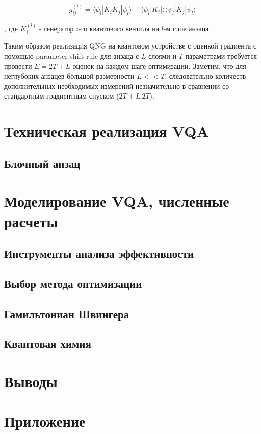 \documentclass[12pt]{extarticle}
\begin{document}
\begin{equation}
g_{ij}^{(l)} = \langle \psi_{l} | K_{i}K_{j} |\psi_{l}  \rangle - \langle \psi_{l} | K_{i} | \rangle  \langle \psi_{l} | K_{j} |\psi_{l}  \rangle 
\end{equation}

, где $K^{(l)}_{i}$ - генератор $i$-го квантового вентиля на $l$-м слое анзаца.

\qquad Таким образом реализация QNG на квантовом устройстве с оценкой градиента с помощью parameter-shift rule для анзаца с $L$ слоями и $T$ параметрами требуется провести $E = 2T + L$ оценок на каждом шаге оптимизации. Заметим, что для неглубоких анзацев большой размерности $L<<T$, следовательно количеств дополнительных необходимых измерений незначительно в сравнении со стандартным градиентным спуском ($2T + L ~ 2T$).



\section{Техническая реализация VQA}
\subsection{Блочный анзац}

\section{Моделирование VQA, численные расчеты}
\subsection{Инструменты анализа эффективности}
\subsection{Выбор метода оптимизации}
\subsection{Гамильтониан Швингера}
\subsection{Квантовая химия}



\section{Выводы}

\section{Приложение}
\end{document}
